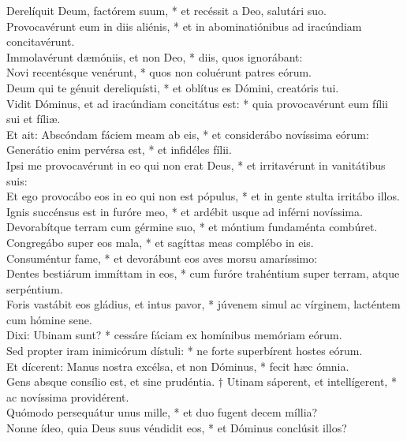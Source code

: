 {	Derelíquit Deum, factórem suum, * et recéssit a Deo, salutári suo. \\
	Provocavérunt eum in diis aliénis, * et in abominatiónibus ad iracúndiam concitavérunt. \\
	Immolavérunt dæmóniis, et non Deo, * diis, quos ignorábant: \\
	Novi recentésque venérunt, * quos non coluérunt patres eórum. \\
	Deum qui te génuit dereliquísti, * et oblítus es Dómini, creatóris tui. \\
	Vidit Dóminus, et ad iracúndiam concitátus est: * quia provocavérunt eum fílii sui et fíliæ. \\
	Et ait: Abscóndam fáciem meam ab eis, * et considerábo novíssima eórum:  \\
	Generátio enim pervérsa est, * et infidéles fílii. \\
	Ipsi me provocavérunt in eo qui non erat Deus, * et irritavérunt in vanitátibus suis:  \\
	Et ego provocábo eos in eo qui non est pópulus, * et in gente stulta irritábo illos. \\
	Ignis succénsus est in furóre meo, * et ardébit usque ad inférni novíssima. \\
	Devorabítque terram cum gérmine suo, * et móntium fundaménta combúret. \\
	Congregábo super eos mala, * et sagíttas meas complébo in eis. \\
	Consuméntur fame, * et devorábunt eos aves morsu amaríssimo:  \\
	Dentes bestiárum immíttam in eos, * cum furóre trahéntium super terram, atque serpéntium. \\
	Foris vastábit eos gládius, et intus pavor, * júvenem simul ac vírginem, lacténtem cum hómine sene. \\
	Dixi: Ubinam sunt? * cessáre fáciam ex homínibus memóriam eórum. \\
	Sed propter iram inimicórum dístuli: * ne forte superbírent hostes eórum.  \\
	Et dícerent: Manus nostra excélsa, et non Dóminus, * fecit hæc ómnia. \\
	Gens absque consílio est, et sine prudéntia. † Utinam sáperent, et intellígerent, * ac novíssima providérent. \\
	Quómodo persequátur unus mille, * et duo fugent decem míllia?  \\
	Nonne ídeo, quia Deus suus véndidit eos, * et Dóminus conclúsit illos? \\
}
